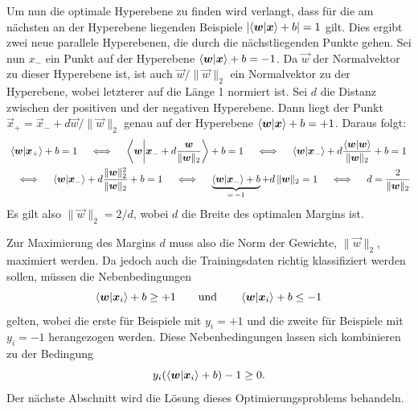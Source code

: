 				Um nun die optimale Hyperebene zu finden wird verlangt, dass für die am nächsten an der Hyperebene liegenden Beispiele \( \lvert \braket{\bm{w}}{\bm{x}} + b \rvert = 1 \) gilt. Dies ergibt zwei neue parallele Hyperebenen, die durch die nächstliegenden Punkte gehen. Sei nun \( x_- \) ein Punkt auf der Hyperebene \( \braket{\bm{w}}{\bm{x}} + b = -1 \). Da \( \vec{w} \) der Normalvektor zu dieser Hyperebene ist, ist auch \( \vec{w} / \lVert \vec{w} \rVert_2 \) ein Normalvektor zu der Hyperebene, wobei letzterer auf die Länge \num{1} normiert ist. Sei \(d\) die Distanz zwischen der positiven und der negativen Hyperebene. Dann liegt der Punkt \( \vec{x}_+ = \vec{x}_- +	 d \vec{w} / \lVert \vec{w} \rVert_2 \) genau auf der Hyperebene \( \braket{\bm{w}}{\bm{x}} + b = +1 \). Daraus folgt:
				\begin{gather}
					\braket{\bm{w}}{\bm{x}_+} + b = 1
					\quad\iff\quad
					\braket{\bm{w}}{\bm{x}_- + d \frac{\bm{w}}{\lVert \bm{w} \rVert_2}} + b = 1
					\quad\iff\quad
					\braket{\bm{w}}{\bm{x}_-} + d \frac{\braket{\bm{w}}{\bm{w}}}{\lVert \bm{w} \rVert_2} + b = 1 \\
					\quad\iff\quad
					\braket{\bm{w}}{\bm{x}_-} + d \frac{\lVert \bm{w} \rVert_2^2}{\lVert \bm{w} \rVert_2} + b = 1
					\quad\iff\quad
					\underbrace{\braket{\bm{w}}{\bm{x}_-} + b}_{=\, -1} + d \, \lVert \bm{w} \rVert_2 = 1
					\quad\iff\quad
					d = \frac{2}{\lVert \bm{w} \rVert_2}
				\end{gather}
				Es gilt also \( \lVert \vec{w} \rVert_2 = 2/d \), wobei \(d\) die Breite des optimalen Margins ist.

				Zur Maximierung des Margins \(d\) muss also die Norm der Gewichte, \(\lVert \vec{w} \rVert_2\), maximiert werden. Da jedoch auch die Trainingsdaten richtig klassifiziert werden sollen, müssen die Nebenbedingungen
				\begin{equation}
					\braket{\bm{w}}{\bm{x}_i} + b \geq +1
					\qquad\text{und}\qquad
					\braket{\bm{w}}{\bm{x}_i} + b \leq -1
				\end{equation}
				gelten, wobei die erste für Beispiele mit \(y_i = +1\) und die zweite für Beispiele mit \(y_i = -1\) herangezogen werden. Diese Nebenbedingungen lassen sich kombinieren zu der Bedingung
				\begin{equation}
					y_i (\braket{\bm{w}}{\bm{x}_i} + b) - 1 \geq 0.
				\end{equation}
				Der nächste Abschnitt wird die Lösung dieses Optimierungsproblems behandeln.

